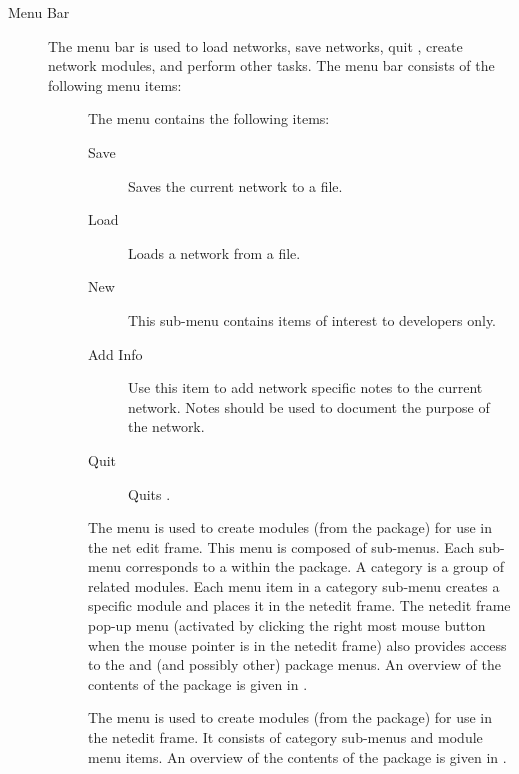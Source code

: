 \begin{description}
\item[Menu Bar] The menu bar is used to load networks, save networks, quit
  \sr{}, create network modules, and perform other tasks.  The menu bar
  consists of the following menu items:

  \begin{description}
  \item[] The  menu contains the following items:
    \begin{description}
    \item[Save] Saves the current network to a file.
    \item[Load] Loads a network from a file.
    \item[New] This sub-menu contains items of interest to developers only.
    \item[Add Info] Use this item to add network specific notes to
      the current network.  Notes should be used to document the purpose of
      the network.
    \item[Quit] Quits \sr{}.
    \end{description}
  \end{description}
  
  \begin{description}
  \item[] The  menu is used to create modules
    (from the \sr{} package) for use in the net edit frame.  This menu is
    composed of sub-menus. Each sub-menu corresponds to a 
     within the \sr{} package.  A category is a group of
    related modules.  Each menu item in a category sub-menu creates a
    specific module and places it in the netedit frame.  The netedit frame
    pop-up menu (activated by clicking the right most mouse button when the
    mouse pointer is in the netedit frame) also provides access to the
    \menu{\sr{}} and \menu{\pse{}} (and possibly other) package menus.  An
    overview of the contents of the \sr{} package is given in .
  \end{description}

  \begin{description}
  \item[] The  menu is used to create modules
    (from the \pse package) for use in the netedit frame.  It consists
    of category sub-menus and module menu items.   An overview of the
    contents of the \sr{} package is given in .
  \end{description}


\end{description}
